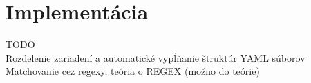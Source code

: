 \chapter{Implementácia}
{}
TODO\\
Rozdelenie zariadení a automatické vypĺňanie štruktúr YAML súborov\\
Matchovanie cez regexy, teória o REGEX (možno do teórie)\\
